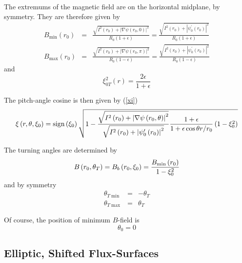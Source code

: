 \documentclass{article}
\begin{document}
The extremums of the magnetic field are on the horizontal midplane, by
symmetry. They are therefore given by
\begin{eqnarray}
B_{\min }\left( r_{0}\right)  &=&\frac{\sqrt{I^{2}\left( r_{0}\right)
+\left| \nabla \psi \left( r_{0},0\right) \right| ^{2}}}{R_{0}\left(
1+\epsilon \right) }=\frac{\sqrt{I^{2}\left( r_{0}\right) +\left| \psi
_{0}^{\prime }\left( r_{0}\right) \right| ^{2}}}{R_{0}\left( 1+\epsilon
\right) } \\
B_{\max }\left( r_{0}\right)  &=&\frac{\sqrt{I^{2}\left( r_{0}\right)
+\left| \nabla \psi \left( r_{0},\pi \right) \right| ^{2}}}{R_{0}\left(
1-\epsilon \right) }=\frac{\sqrt{I^{2}\left( r_{0}\right) +\left| \psi
_{0}^{\prime }\left( r_{0}\right) \right| ^{2}}}{R_{0}\left( 1-\epsilon
\right) }
\end{eqnarray}
and 
\begin{equation}
\xi _{0T}^{2}\left( r\right) =\frac{2\epsilon }{1+\epsilon }
\end{equation}

The pitch-angle cosine is then given by (\ref{xi}) 
\begin{equation}
\xi \left( r,\theta ,\xi _{0}\right) =\text{sign}\left( \xi _{0}\right) 
\sqrt{1-\frac{\sqrt{I^{2}\left( r_{0}\right) +\left| \nabla \psi \left(
r_{0},\theta \right) \right| ^{2}}}{\sqrt{I^{2}\left( r_{0}\right) +\left|
\psi _{0}^{\prime }\left( r_{0}\right) \right| ^{2}}}\frac{1+\epsilon }{%
1+\epsilon \cos \theta r/r_{0}}\left( 1-\xi _{0}^{2}\right) }  \label{xicirc}
\end{equation}

The turning angles are determined by 
\begin{equation}
B\left( r_{0},\theta _{T}\right) =B_{b}\left( r_{0},\xi _{0}\right) =\frac{%
B_{\min }\left( r_{0}\right) }{1-\xi _{0}^{2}}
\end{equation}
and by symmetry 
\begin{eqnarray}
\theta _{T\min } &=&-\theta _{T} \\
\theta _{T\max } &=&\theta _{T}
\end{eqnarray}

Of course, the position of minimum $B$-field is 
\begin{equation}
\theta _{0}=0
\end{equation}

\subsection{Elliptic, Shifted Flux-Surfaces}
\end{document}
